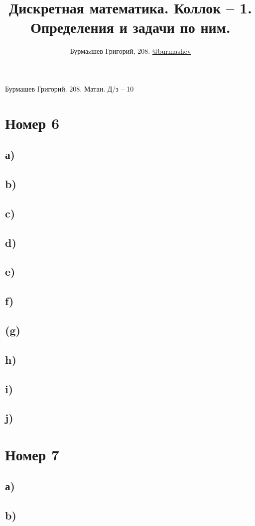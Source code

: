 \documentclass[a4paper,12pt]{article}
\author{Бурмаzшев Григорий, 208. \href{https://teleg.run/burmashev}{@burmashev}}
\title{Дискретная математика. Коллок -- 1. Определения и задачи по ним.}
\begin{document}
\begin{center}
Бурмашев Григорий.  208. Матан. Д/з -- 10 
\end{center}
\section*{Номер 6}
\subsection*{а)}
\subsection*{b)}
\subsection*{c)}
\subsection*{d)}
\subsection*{e)}
\subsection*{f)}
\subsection*{(g)}
\subsection*{h)}
\subsection*{i)}
\subsection*{j)}
\section*{Номер 7}
\subsection*{а)}
\subsection*{b)}
\end{document}
